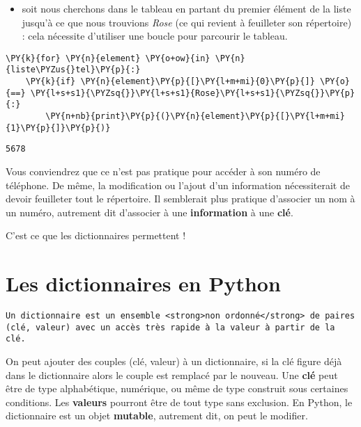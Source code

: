 \documentclass[12pt]{book}
\begin{document}
    \begin{itemize}
\tightlist
\item
  soit nous cherchons dans le tableau en partant du premier élément de
  la liste jusqu'à ce que nous trouvions \emph{Rose} (ce qui revient à
  feuilleter son répertoire) : cela nécessite d'utiliser une boucle pour
  parcourir le tableau.
\end{itemize}

    \begin{tcolorbox}[breakable, size=fbox, boxrule=1pt, pad at break*=1mm,colback=cellbackground, colframe=cellborder]
\begin{Verbatim}[commandchars=\\\{\}]
\PY{k}{for} \PY{n}{element} \PY{o+ow}{in} \PY{n}{liste\PYZus{}tel}\PY{p}{:}
    \PY{k}{if} \PY{n}{element}\PY{p}{[}\PY{l+m+mi}{0}\PY{p}{]} \PY{o}{==} \PY{l+s+s1}{\PYZsq{}}\PY{l+s+s1}{Rose}\PY{l+s+s1}{\PYZsq{}}\PY{p}{:}
        \PY{n+nb}{print}\PY{p}{(}\PY{n}{element}\PY{p}{[}\PY{l+m+mi}{1}\PY{p}{]}\PY{p}{)}
\end{Verbatim}
\end{tcolorbox}

    \begin{Verbatim}[commandchars=\\\{\}]
5678
    \end{Verbatim}

    Vous conviendrez que ce n'est pas pratique pour accéder à son numéro de
téléphone. De même, la modification ou l'ajout d'un information
nécessiterait de devoir feuilleter tout le répertoire. Il semblerait
plus pratique d'associer un nom à un numéro, autrement dit d'associer à
une \textbf{information} à une \textbf{clé}.

C'est ce que les dictionnaires permettent !

    \hypertarget{les-dictionnaires-en-python}{%
\section{Les dictionnaires en
Python}\label{les-dictionnaires-en-python}}

    \begin{verbatim}
Un dictionnaire est un ensemble <strong>non ordonné</strong> de paires (clé, valeur) avec un accès très rapide à la valeur à partir de la clé.
\end{verbatim}

    On peut ajouter des couples (clé, valeur) à un dictionnaire, si la clé
figure déjà dans le dictionnaire alors le couple est remplacé par le
nouveau. Une \textbf{clé} peut être de type alphabétique, numérique, ou
même de type construit sous certaines conditions. Les \textbf{valeurs}
pourront être de tout type sans exclusion. En Python, le dictionnaire
est un objet \textbf{mutable}, autrement dit, on peut le modifier.
\end{document}
